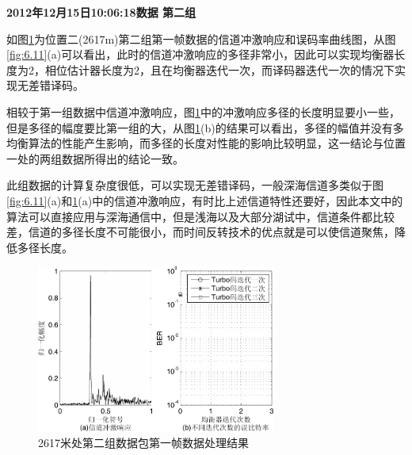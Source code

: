 \textbf{\sihao 2012年12月15日10:06:18数据 第二组} 

如图\ref{fig:6.12}为位置二(2617m)第二组第一帧数据的信道冲激响应和误码率曲线图，从图\ref{fig:6.11}(a)可以看出，此时的信道冲激响应的多径非常小，因此可以实现均衡器长度为2，相位估计器长度为2，且在均衡器迭代一次，而译码器迭代一次的情况下实现无差错译码。

相较于第一组数据中信道冲激响应，图\ref{fig:6.12}中的冲激响应多径的长度明显要小一些，但是多径的幅度要比第一组的大，从图\ref{fig:6.12}(b)的结果可以看出，多径的幅值并没有多均衡算法的性能产生影响，而多径的长度对性能的影响比较明显，这一结论与位置一处的两组数据所得出的结论一致。

此组数据的计算复杂度很低，可以实现无差错译码，一般深海信道多类似于图\ref{fig:6.11}(a)和\ref{fig:6.12}(a)中的信道冲激响应，有时比上述信道特性还要好，因此本文中的算法可以直接应用与深海通信中，但是浅海以及大部分湖试中，信道条件都比较差，信道的多径长度不可能很小，而时间反转技术的优点就是可以使信道聚焦，降低多径长度。

\begin{figure}[htb]
  \begin{center}
    \includegraphics[width=0.7\textwidth]{images/result_2_2_s.pdf}
  \end{center}
  \caption{2617米处第二组数据包第一帧数据处理结果}
  \label{fig:6.12}
\end{figure}

